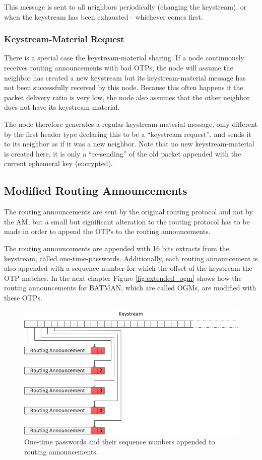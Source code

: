 This message is sent to all neighbors periodically (changing the keystream), or
when the keystream has been exhausted - whichever comes first.

\subsubsection*{Keystream-Material Request}
There is a special case the keystream-material sharing. If a node continuously
receives routing announcements with bad \acp{OTP}, the node will assume the
neighbor has created a new keystream but its keystream-material message has not
been successfully received by this node. Because this often happens if the
packet delivery ratio is very low, the node also assumes that the other neighbor
does not have its keystream-material.

The node therefore generates a regular keystream-material message, only
different by the first header type declaring this to be a ``keystream request'',
and sends it to its neighbor as if it was a new neighbor. Note that no new
keystream-material is created here, it is only a ``re-sending'' of the old
packet appended with the current ephemeral key (encrypted).

\subsection{Modified Routing Announcements}
The routing announcements are sent by the original routing protocol and not by
the \ac{AM}, but a small but significant alteration to the routing protocol has
to be made in order to append the \acp{OTP} to the routing announcements.

The routing announcements are appended with 16 bits extracts from the keystream,
called one-time-passwords. Additionally, each routing announcement is also
appended with a sequence number for which the offset of the keystream the
\ac{OTP} matches. In the next chapter Figure \ref{fig:extended_ogm} shows how
the routing announcements for BATMAN, which are called \acp{OGM}, are modified
with these \acp{OTP}.

\begin{figure}[h]
	\centering
  	\includegraphics[width=\textwidth]{images/appending_otp_from_keystream.png}
  	\caption{One-time passwords and their sequence numbers appended to routing announcements.}
	\label{fig:appending_otp_from_keystream}
\end{figure}

